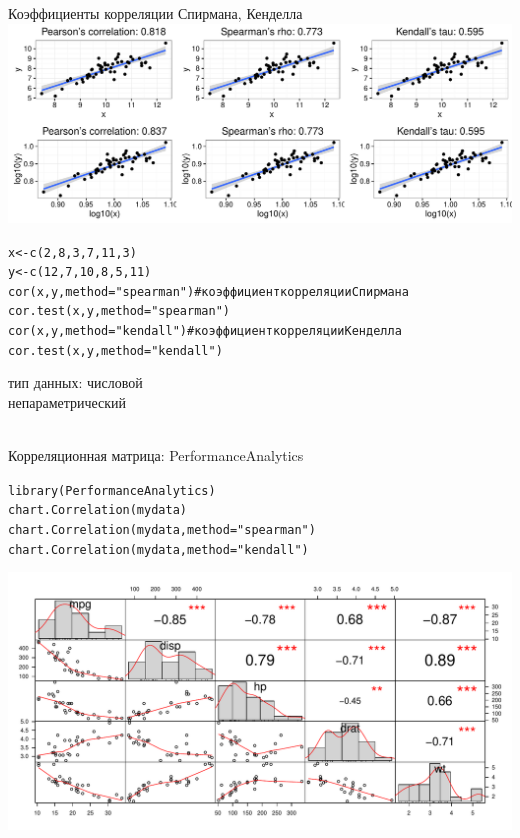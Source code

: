 \begin{frame}{Коэффициенты корреляции Спирмана, Кенделла}
\includegraphics[width=\linewidth]{correlation2.pdf}\\
\scriptsize
\begin{alltt}
x <- c(2, 8, 3, 7, 11, 3)\\
y <- c(12, 7, 10, 8, 5, 11)\\
\alert{cor(x, y, method = "spearman") \hfill \# коэффициент корреляции Спирмана}\\
\alert{cor.test(x, y, method = "spearman")}\\
\alert{cor(x, y, method = "kendall") \hfill \# коэффициент корреляции Кенделла}\\
\alert{cor.test(x, y, method = "kendall")}
\end{alltt}
\normalsize
\vfill
тип данных: числовой\\
непараметрический\\~
\end{frame}
\begin{frame}{Корреляционная матрица: PerformanceAnalytics}
\scriptsize
\begin{alltt}
library(PerformanceAnalytics)\\
chart.Correlation(mydata)\\
chart.Correlation(mydata, method = "spearman")\\
chart.Correlation(mydata, method = "kendall")
\end{alltt}
\normalsize
\includegraphics[width=\linewidth]{cormatrix1.pdf}
\end{frame}
